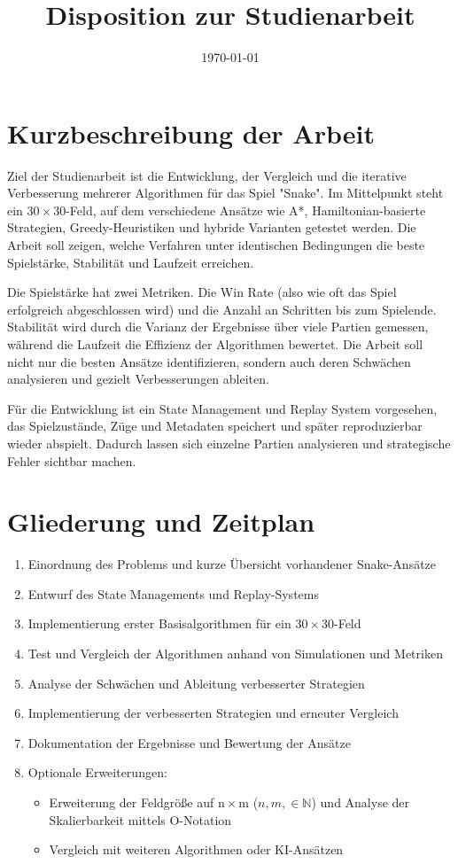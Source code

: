 \documentclass[a4paper]{scrartcl}
\title{\Large Disposition zur Studienarbeit\\\LARGE \titlename}
\author{\authorname}
\date{\today}
\newcommand{\boardsize}{30\,$\times$\,30}
\begin{document}
\maketitle

\section{Kurzbeschreibung der Arbeit}
Ziel der Studienarbeit ist die Entwicklung, der Vergleich und die iterative Verbesserung mehrerer Algorithmen für das Spiel "Snake". Im Mittelpunkt steht ein \boardsize-Feld, auf dem verschiedene Ansätze wie A*, Hamiltonian-basierte Strategien, Greedy-Heuristiken und hybride Varianten getestet werden. Die Arbeit soll zeigen, welche Verfahren unter identischen Bedingungen die beste Spielstärke, Stabilität und Laufzeit erreichen.

Die Spielstärke hat zwei Metriken. Die Win Rate (also wie oft das Spiel erfolgreich abgeschlossen wird) und die Anzahl an Schritten bis zum Spielende. Stabilität wird durch die Varianz der Ergebnisse über viele Partien gemessen, während die Laufzeit die Effizienz der Algorithmen bewertet. Die Arbeit soll nicht nur die besten Ansätze identifizieren, sondern auch deren Schwächen analysieren und gezielt Verbesserungen ableiten.

Für die Entwicklung ist ein State Management und Replay System vorgesehen, das Spielzustände, Züge und Metadaten speichert und später reproduzierbar wieder abspielt. Dadurch lassen sich einzelne Partien analysieren und strategische Fehler sichtbar machen.

\section{Gliederung und Zeitplan}
\begin{enumerate}
\item Einordnung des Problems und kurze Übersicht vorhandener Snake-Ansätze
\item Entwurf des State Managements und Replay-Systems
\item Implementierung erster Basisalgorithmen für ein \boardsize-Feld
\item Test und Vergleich der Algorithmen anhand von Simulationen und Metriken
\item Analyse der Schwächen und Ableitung verbesserter Strategien
\item Implementierung der verbesserten Strategien und erneuter Vergleich
\item Dokumentation der Ergebnisse und Bewertung der Ansätze
\item Optionale Erweiterungen:
    \begin{itemize}
        \item Erweiterung der Feldgröße auf n\,$\times$\,m ($n, m, \in \mathbb{N}$) und Analyse der Skalierbarkeit mittels O-Notation
        \item Vergleich mit weiteren Algorithmen oder KI-Ansätzen
    \end{itemize}
\end{enumerate}
\end{document}
